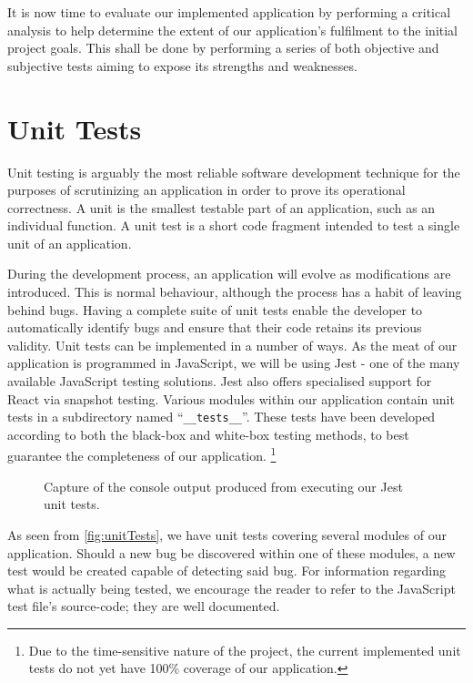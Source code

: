 \documentclass{standalone}
\begin{document}
	It is now time to evaluate our implemented application by performing a critical analysis to help determine the extent of our application's fulfilment to the initial project goals. This shall be done by performing a series of both objective and subjective tests aiming to expose its strengths and weaknesses.

	\section{Unit Tests}
		Unit testing is arguably the most reliable software development technique for the purposes of scrutinizing an application in order to prove its operational correctness. A unit is the smallest testable part of an application, such as an individual function. A unit test is a short code fragment intended to test a single unit of an application.

		During the development process, an application will evolve as modifications are introduced. This is normal behaviour, although the process has a habit of leaving behind bugs. Having a complete suite of unit tests enable the developer to automatically identify bugs and ensure that their code retains its previous validity. Unit tests can be implemented in a number of ways. As the meat of our application is programmed in JavaScript, we will be using Jest \parencite{jest} - one of the many available JavaScript testing solutions. Jest also offers specialised support for React via snapshot testing. Various modules within our application contain unit tests in a subdirectory named \enquote{\texttt{\_\_tests\_\_}}. These tests have been developed according to both the black-box and white-box testing methods, to best guarantee the completeness of our application. \footnote{Due to the time-sensitive nature of the project, the current implemented unit tests do not yet have 100\% coverage of our application.}

		\begin{figure}[!htbp]
			\begin{formal}
				
			\end{formal}
			\caption{Capture of the console output produced from executing our Jest unit tests.} \label{fig:unitTests}
		\end{figure}

		As seen from \autoref{fig:unitTests}, we have unit tests covering several modules of our application. Should a new bug be discovered within one of these modules, a new test would be created capable of detecting said bug. For information regarding what is actually being tested, we encourage the reader to refer to the JavaScript test file's source-code; they are well documented.
\end{document}
